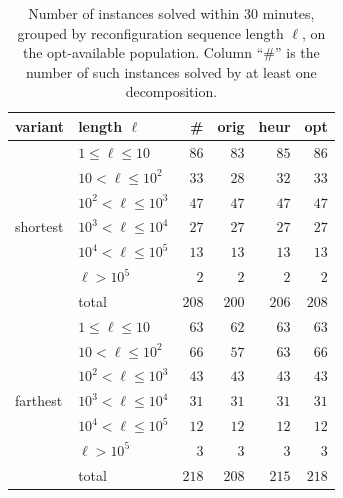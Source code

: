 \documentclass[conference]{IEEEtran}
\newcommand{\OrigDecom}{\textsf{orig}\xspace}
\newcommand{\HeurDecom}{\textsf{heur}\xspace}
\newcommand{\OptDecom}{\textsf{opt}\xspace}
\begin{document}
\begin{table}[t]
  \centering
  \caption{Number of instances solved within $30$ minutes, grouped by
  reconfiguration sequence length $\ell$, on the opt-available population.
  Column ``\#'' is the number of such instances solved by at least one decomposition.}
  \label{tab:reconflen}
  \begin{tabular}{llrrrr}
    \hline
    variant & length $\ell$ & \# & \OrigDecom & \HeurDecom & \OptDecom \\
    \hline
    \multirow{7}{*}{shortest}
      & $1 \le \ell \le 10$        & $86$  & $83$  & $85$  & $86$  \\
      & $10 < \ell \le 10^{2}$     & $33$  & $28$  & $32$  & $33$  \\
      & $10^{2} < \ell \le 10^{3}$ & $47$  & $47$  & $47$  & $47$  \\
      & $10^{3} < \ell \le 10^{4}$ & $27$  & $27$  & $27$  & $27$  \\
      & $10^{4} < \ell \le 10^{5}$ & $13$  & $13$  & $13$  & $13$  \\
      & $\ell > 10^{5}$            & $2$   & $2$   & $2$   & $2$   \\
      \cline{2-6}
      & total                      & $208$ & $200$ & $206$ & $208$ \\
    \hline
    \multirow{7}{*}{farthest}
      & $1 \le \ell \le 10$        & $63$  & $62$  & $63$  & $63$  \\
      & $10 < \ell \le 10^{2}$     & $66$  & $57$  & $63$  & $66$  \\
      & $10^{2} < \ell \le 10^{3}$ & $43$  & $43$  & $43$  & $43$  \\
      & $10^{3} < \ell \le 10^{4}$ & $31$  & $31$  & $31$  & $31$  \\
      & $10^{4} < \ell \le 10^{5}$ & $12$  & $12$  & $12$  & $12$  \\
      & $\ell > 10^{5}$            & $3$   & $3$   & $3$   & $3$   \\
      \cline{2-6}
      & total                      & $218$ & $208$ & $215$ & $218$ \\
    \hline
  \end{tabular}
\end{table}
\end{document}

